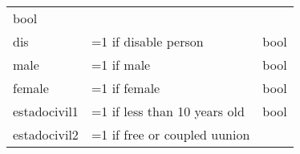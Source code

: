 \documentclass[11pt]{article}
\begin{document}
\begin{longtable}[]{@{}lll@{}}
\begin{minipage}[t]{0.24\columnwidth}
bool\strut
\end{minipage}\tabularnewline
\begin{minipage}[t]{0.19\columnwidth}\raggedright\strut
dis\strut
\end{minipage} & \begin{minipage}[t]{0.16\columnwidth}\raggedright\strut
=1 if disable person\strut
\end{minipage} & \begin{minipage}[t]{0.24\columnwidth}\raggedright\strut
bool\strut
\end{minipage}\tabularnewline
\begin{minipage}[t]{0.19\columnwidth}\raggedright\strut
male\strut
\end{minipage} & \begin{minipage}[t]{0.16\columnwidth}\raggedright\strut
=1 if male\strut
\end{minipage} & \begin{minipage}[t]{0.24\columnwidth}\raggedright\strut
bool\strut
\end{minipage}\tabularnewline
\begin{minipage}[t]{0.19\columnwidth}\raggedright\strut
female\strut
\end{minipage} & \begin{minipage}[t]{0.16\columnwidth}\raggedright\strut
=1 if female\strut
\end{minipage} & \begin{minipage}[t]{0.24\columnwidth}\raggedright\strut
bool\strut
\end{minipage}\tabularnewline
\begin{minipage}[t]{0.19\columnwidth}\raggedright\strut
estadocivil1\strut
\end{minipage} & \begin{minipage}[t]{0.16\columnwidth}\raggedright\strut
=1 if less than 10 years old\strut
\end{minipage} & \begin{minipage}[t]{0.24\columnwidth}\raggedright\strut
bool\strut
\end{minipage}\tabularnewline
\begin{minipage}[t]{0.19\columnwidth}\raggedright\strut
estadocivil2\strut
\end{minipage} & \begin{minipage}[t]{0.16\columnwidth}\raggedright\strut
=1 if free or coupled uunion\strut
\end{minipage} & \begin{minipage}[t]{0.24\columnwidth}\raggedright\strut

\end{minipage}
\end{longtable}
\end{document}
